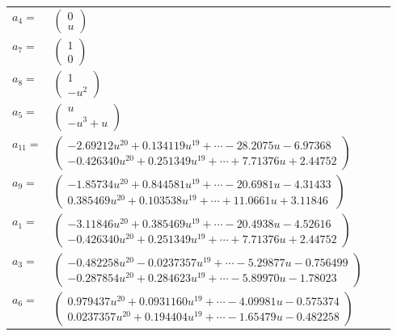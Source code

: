 \documentclass[1p]{elsarticle_modified}
\theoremstyle{definition}
\begin{document}
\begin{tabular}{m{7pt} m{180pt} m{7pt} m{180pt} }
\flushright $a_{4}=$&$\begin{pmatrix}0\\u\end{pmatrix}$ \\
\flushright $a_{7}=$&$\begin{pmatrix}1\\0\end{pmatrix}$ \\
\flushright $a_{8}=$&$\begin{pmatrix}1\\- u^2\end{pmatrix}$ \\
\flushright $a_{5}=$&$\begin{pmatrix}u\\- u^3+u\end{pmatrix}$ \\
\flushright $a_{11}=$&$\begin{pmatrix}-2.69212 u^{20}+0.134119 u^{19}+\cdots-28.2075 u-6.97368\\-0.426340 u^{20}+0.251349 u^{19}+\cdots+7.71376 u+2.44752\end{pmatrix}$ \\
\flushright $a_{9}=$&$\begin{pmatrix}-1.85734 u^{20}+0.844581 u^{19}+\cdots-20.6981 u-4.31433\\0.385469 u^{20}+0.103538 u^{19}+\cdots+11.0661 u+3.11846\end{pmatrix}$ \\
\flushright $a_{1}=$&$\begin{pmatrix}-3.11846 u^{20}+0.385469 u^{19}+\cdots-20.4938 u-4.52616\\-0.426340 u^{20}+0.251349 u^{19}+\cdots+7.71376 u+2.44752\end{pmatrix}$ \\
\flushright $a_{3}=$&$\begin{pmatrix}-0.482258 u^{20}-0.0237357 u^{19}+\cdots-5.29877 u-0.756499\\-0.287854 u^{20}+0.284623 u^{19}+\cdots-5.89970 u-1.78023\end{pmatrix}$ \\
\flushright $a_{6}=$&$\begin{pmatrix}0.979437 u^{20}+0.0931160 u^{19}+\cdots-4.09981 u-0.575374\\0.0237357 u^{20}+0.194404 u^{19}+\cdots-1.65479 u-0.482258\end{pmatrix}$ \\

\end{tabular}
\end{document}
